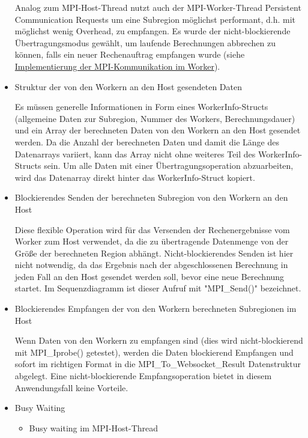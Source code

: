 \begin{itemize}
	      Analog zum MPI-Host-Thread nutzt auch der MPI-Worker-Thread Persistent Communication Requests um eine Subregion möglichst performant, d.h. mit möglichst wenig Overhead, zu empfangen. Es wurde der nicht-blockierende Übertragungsmodus gewählt, um laufende Berechnungen abbrechen zu können, falls ein neuer Rechenauftrag empfangen wurde (siehe \hyperref[para:impl_mpi_worker]{Implementierung der MPI-Kommunikation im Worker}).

	\item Struktur der von den Workern an den Host gesendeten Daten

	      Es müssen generelle Informationen in Form eines WorkerInfo-Structs (allgemeine Daten zur Subregion, Nummer des Workers, Berechnungsdauer) und ein Array der berechneten Daten von den Workern an den Host gesendet werden. Da die Anzahl der berechneten Daten und damit die Länge des Datenarrays variiert, kann das Array nicht ohne weiteres Teil des WorkerInfo-Structs sein. Um alle Daten mit einer Übertragungsoperation abzuarbeiten, wird das Datenarray direkt hinter das WorkerInfo-Struct kopiert.

	\item Blockierendes Senden der berechneten Subregion von den Workern an den Host

	      Diese flexible Operation wird für das Versenden der Rechenergebnisse vom Worker zum Host verwendet, da die zu übertragende Datenmenge von der Größe der berechneten Region abhängt. Nicht-blockierendes Senden ist hier nicht notwendig, da das Ergebnis nach der abgeschlossenen Berechnung in jeden Fall an den Host gesendet werden soll, bevor eine neue Berechnung startet. Im Sequenzdiagramm ist dieser Aufruf mit "MPI\_Send()" bezeichnet.

	\item Blockierendes Empfangen der von den Workern berechneten Subregionen im Host

	      Wenn Daten von den Workern zu empfangen sind (dies wird nicht-blockierend mit MPI\_Iprobe() getestet), werden die Daten blockierend Empfangen und sofort im richtigen Format in die MPI\_To\_Websocket\_Result Datenstruktur abgelegt. Eine nicht-blockierende Empfangsoperation bietet in diesem Anwendungsfall keine Vorteile.

	\item Busy Waiting

	      \begin{itemize}
		      \item Busy waiting im MPI-Host-Thread


\end{itemize}
\end{itemize}
